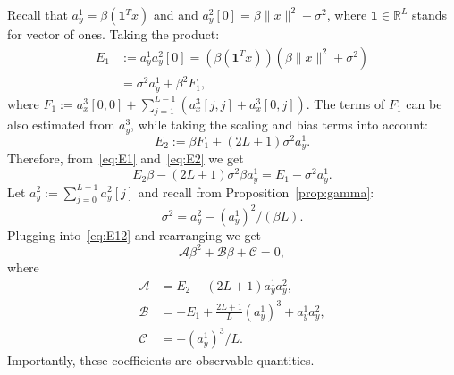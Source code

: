 \documentclass[english,11pt]{article}
\numberwithin{equation}{section}
\theoremstyle{plain}
\theoremstyle{definition}
\theoremstyle{remark}
\theoremstyle{plain}
\theoremstyle{remark}
\theoremstyle{plain}
\theoremstyle{plain}
\newcommand{\RL}{\mathbb{R}^L}
\newcommand{\one}{\mathbf{1}}
\begin{document}
Recall that $a_y^1 = \beta(\one^Tx)$ and  
and $a_y^2[0] = \beta\|x\|^2+\sigma^2$, where $\one\in\RL$ stands for vector of ones. Taking the product:
\begin{equation}\label{eq:E1}
\begin{split}
E_1 &:= a_y^1a_y^2[0] =  (\beta(\one^Tx))(\beta\|x\|^2+\sigma^2) \\
& = \sigma^2a_y^1 + \beta^2F_1,
 \end{split}
\end{equation}
where $F_1 := a_x^3[0,0] + \sum_{j=1}^{L-1}(a_x^3[j,j] + a_x^3[0,j])$. 
The terms of $F_1$ can be also estimated from $a_y^3$, while taking the scaling and bias terms into account:
\begin{equation} \label{eq:E2}
E_2:= \beta F_1 + (2L+1)\sigma^2a_y^1.
\end{equation}
Therefore, from~\eqref{eq:E1} and~\eqref{eq:E2} we get
\begin{equation} \label{eq:E12}
E_2\beta -(2L+1)\sigma^2\beta a_y^1 = E_1-\sigma^2a_y^1.
\end{equation}
Let $a_y^2:=\sum_{j=0}^{L-1}a_y^2[j]$ and recall from Proposition~\ref{prop:gamma}:
\begin{equation} \label{eq:sigma2}
\sigma^2 = a_y^2 - (a^1_y)^2/(\beta L). 
\end{equation} 
Plugging into~\eqref{eq:E12} and rearranging we get 
\begin{equation} \label{eq:quad1}
\mathcal{A}\beta^2 + \mathcal{B}\beta + \mathcal{C} = 0,
\end{equation}
where 
\begin{align*}
\mathcal{A} &= E_2 - (2L+1)a_y^1a_y^2, \\ 
\mathcal{B} &= -E_1 + \frac{2L+1}{L}(a_y^1)^3 + a_y^1a_y^2  , \\
\mathcal{C} &= -(a_y^1)^3/L.
\end{align*}
Importantly, these coefficients are observable quantities. 
\end{document}
